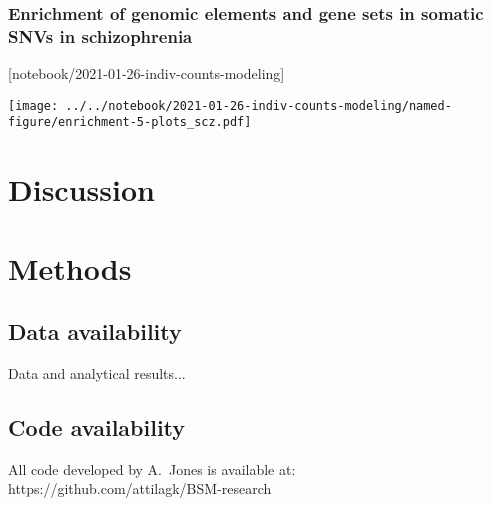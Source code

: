 \documentclass[letterpaper]{article}
\begin{document}
\subsubsection*{Enrichment of genomic elements and gene sets in somatic SNVs in schizophrenia}

[notebook/2021-01-26-indiv-counts-modeling]

\texttt{[image: ../../notebook/2021-01-26-indiv-counts-modeling/named-figure/enrichment-5-plots\_scz.pdf]}

\section*{Discussion}


\section*{Methods}


\subsection*{Data availability}

Data and analytical results...

\subsection*{Code availability}

All code developed by A.~Jones is available at:\\
https://github.com/attilagk/BSM-research
\end{document}
